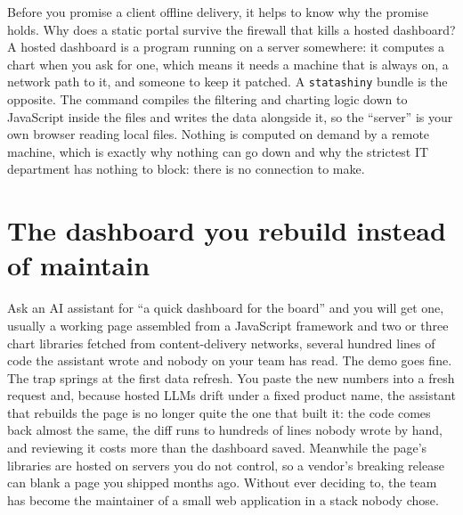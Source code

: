 \documentclass[
    a4paper,
    fontsize=10pt,
    twoside=true,
    numbers=noenddot,
]{kaobook}
\begin{document}
Before you promise a client offline delivery, it helps to know why the promise holds. Why does a static portal survive the firewall that kills a hosted dashboard? A hosted dashboard is a program running on a server somewhere: it computes a chart when you ask for one, which means it needs a machine that is always on, a network path to it, and someone to keep it patched. A \texttt{statashiny} bundle is the opposite. The command compiles the filtering and charting logic down to JavaScript inside the files and writes the data alongside it, so the \enquote{server} is your own browser reading local files. Nothing is computed on demand by a remote machine, which is exactly why nothing can go down and why the strictest IT department has nothing to block: there is no connection to make.

\section{The dashboard you rebuild instead of maintain}\label{sec:dashboardbuilder}
Ask an AI assistant for \enquote{a quick dashboard for the board} and you will get one, usually a working page assembled from a JavaScript framework and two or three chart libraries fetched from content-delivery networks, several hundred lines of code the assistant wrote and nobody on your team has read. The demo goes fine. The trap springs at the first data refresh. You paste the new numbers into a fresh request and, because hosted LLMs drift under a fixed product name, the assistant that rebuilds the page is no longer quite the one that built it: the code comes back almost the same, the diff runs to hundreds of lines nobody wrote by hand, and reviewing it costs more than the dashboard saved. Meanwhile the page's libraries are hosted on servers you do not control, so a vendor's breaking release can blank a page you shipped months ago. Without ever deciding to, the team has become the maintainer of a small web application in a stack nobody chose.
\end{document}
